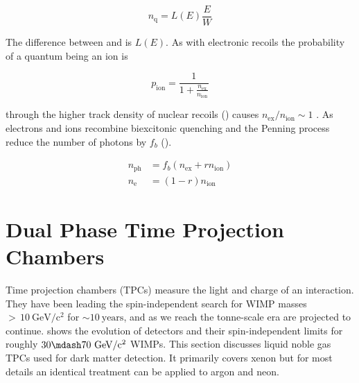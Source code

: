 \begin{equation}
n_{\mathrm{q}} = L(E) \frac{E}{W}
\label{eq:nquant_nr}
\end{equation}

\noindent The difference between  and  is $L(E)$.  As with electronic recoils the probability
of a quantum being an ion is

\begin{equation}
p_{\mathrm{ion}} = \frac{1}{1 + \frac{ n_{\mathrm{ex}} }{ n_{\mathrm{ion}} }}
\end{equation}

\noindent through the higher track density of nuclear recoils ()  causes
$n_{\mathrm{ex}} / n_{\mathrm{ion}} \sim 1$ .  As electrons and ions
recombine biexcitonic quenching and the Penning process reduce the number of photons by $f_b$ ().

\begin{subequations}
\begin{align}
n_{\mathrm{ph}} &= f_b ( n_{\mathrm{ex}} + rn_{\mathrm{ion}} ) \\
n_{\mathrm{e}} &= (1 - r)n_{\mathrm{ion}}
\end{align}
\end{subequations}



\section{Dual Phase Time Projection Chambers}
\label{sec:tpcs}
Time projection chambers (TPCs) measure the light and charge of an interaction.  They have been leading the
spin-independent search for WIMP masses ${>}\, 10\ \mathrm{GeV/c^2}$ for ${\sim}10\ \mathrm{years}$, and as we reach the tonne-scale era
are projected to continue.   shows the evolution of detectors and their spin-independent limits for roughly
$30 \mdash 70\ \mathrm{GeV/c^2}$ WIMPs.  This section discusses liquid noble gas TPCs used for dark matter detection.  It primarily covers
xenon but for most details an identical treatment can be applied to argon and neon.

